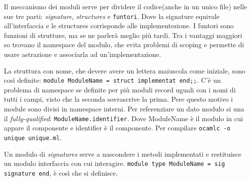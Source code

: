 \documentclass{article}
\begin{document}
\vspace*{0.5cm}

\hspace*{0.5cm}Il meccanismo dei moduli serve per dividere il codice(anche in un unico file) nelle sue tre parti: \textit{signature}, \textit{structures} e \texttt{funtori}.
Dove la signature equivale all'interfaccia e le structures corrisponde alle implementezione.
I funtori sono funzioni di strutture, ma se ne parlerà meglio più tardi.\newline
\hspace*{0.5cm}Tra i vantaggi maggiori so trovano il namespace del modulo, che evita problemi di scoping e permette di usare astrazione e associarla ad un'implementazione.

\vspace*{0.5cm}

\hspace*{0.5cm}La struttura con nome, che devere avere un lettera maiuscola come iniziale, sono così definite: \texttt{module ModuleName = struct implementat end;;}.
C'è un problema di namespace se definite per più moduli record uguali con i nomi di tutti i campi, visto che la seconda sovrascrive la prima.
Pere questo motivo i module sono divisi in namespace interni.\newline
\hspace*{0.5cm}Per referenziare un dato modulo si una il \textit{fully-qualified}: \texttt{ModuleName.identifier}.
Dove ModuleName è il modulo in cui appare il componente e identifier è il componente.
Per compilare \texttt{ocamlc -o unique unique.ml}.

\vspace*{0.5cm}

\hspace*{0.5cm}Un modulo di \textit{signatures} serve a nascondere i metodi implementati e restituisce un modulo interfaccia con cui interagire. \texttt{module type ModuleName = sig signature end}, è così che si definisce.

\vspace*{0.5cm}
\end{document}
